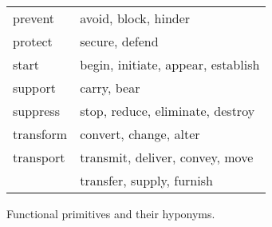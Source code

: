 \documentclass[letterpaper,10pt]{article}
\begin{document}
\begin{figure}[ht]
\begin{center}
\begin{tabular}{l|l}
                      prevent     & avoid, block, hinder\\
                      protect     & secure, defend\\
                      start       & begin, initiate, appear, establish\\
                      support     & carry, bear\\
                      suppress    & stop, reduce, eliminate, destroy\\
                      transform   & convert, change, alter\\
                      transport   & transmit, deliver, convey, move\\
                      & transfer, supply, furnish
                    \end{tabular}
                    \caption{Functional primitives and their hyponyms.}
                    \label{table:func_prims}
                \end{center}
				\end{figure}
\end{document}
